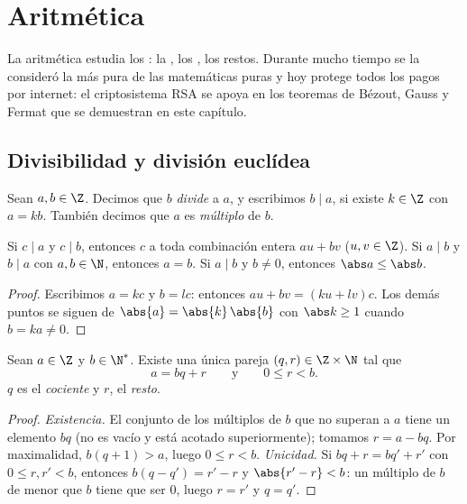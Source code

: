 \chapter{Aritmética}\label{ch:g12:arith}

La aritmética estudia los : la , los , los restos. Durante mucho tiempo se la consideró la más pura de las
matemáticas puras y hoy protege todos los pagos por internet: el
criptosistema RSA se apoya en los teoremas de Bézout, Gauss y Fermat que se
demuestran en este capítulo.

\section{Divisibilidad y división euclídea}

\begin{definition}[Divisibilidad]\label{def:g12:arith:divides}
Sean $a, b \in \Z$. Decimos que $b$ \emph{divide} a
$a$, y escribimos $b \mid a$, si existe $k \in \Z$ con
$a = kb$. También decimos que $a$ es \emph{múltiplo} de $b$.
\end{definition}

\begin{proposition}\label{prop:g12:arith:divprops}
Si $c \mid a$ y $c \mid b$, entonces $c$  a toda combinación entera
$au + bv$ ($u, v \in \Z$). Si $a \mid b$ y $b \mid a$ con $a,b \in \N$,
entonces $a = b$. Si $a \mid b$ y $b \neq 0$, entonces
$\abs a \leq \abs b$.
\end{proposition}

\begin{proof}
Escribimos $a = kc$ y $b = lc$: entonces $au + bv = (ku + lv)c$. Los demás
puntos se siguen de $\abs{a} = \abs{k}\,\abs{b}$ con $\abs k \geq 1$ cuando
$b = ka \neq 0$.
\end{proof}

\begin{theorem}\label{thm:g12:arith:euclid}
Sean $a \in \Z$ y $b \in \N^*$. Existe una única pareja
$(q, r) \in \Z \times \N$ tal que
\[
a = bq + r \qquad\text{y}\qquad 0 \leq r < b .
\]
$q$ es el \emph{cociente} y $r$, el \emph{resto}.
\end{theorem}

\begin{proof}
\emph{Existencia.} El conjunto de los múltiplos de $b$ que no superan a $a$
tiene un elemento  $bq$ (no es vacío y está acotado superiormente);
tomamos $r = a - bq$. Por maximalidad, $b(q+1) > a$, luego $0 \leq r < b$.
\emph{Unicidad.} Si $bq + r = bq' + r'$ con $0 \leq r, r' < b$, entonces
$b(q - q') = r' - r$ y $\abs{r' - r} < b$: un múltiplo de $b$ de  menor que $b$ tiene que ser $0$, luego $r = r'$ y $q = q'$.
\end{proof}

